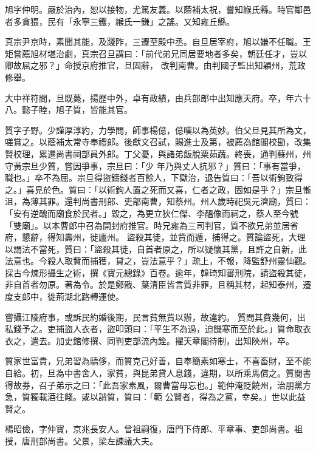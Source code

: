 \begin{pinyinscope}
 旭字仲明。嚴於治內，恕以接物，尤篤友義。以蔭補太祝，嘗知緱氏縣。時官鄰邑者多貪猥，民有「永寧三钁，緱氏一鎌」之謠。又知雍丘縣。



 真宗尹京時，素聞其能，及踐阼，三遷至殿中丞。自旦居宰府，旭以嫌不任職。王矩嘗薦旭材堪治劇，真宗召旦謂曰：「前代弟兄同居要地者多矣，朝廷任才，豈以卿故屈之邪？」命授京府推官，旦固辭，
 改判南曹。由判國子監出知穎州，荒政修舉。



 大中祥符間，旦既薨，揚歷中外，卓有政績，由兵部郎中出知應天府。卒，年六十八。懿子睦，旭子質，皆能其官。



 質字子野。少謹厚淳約，力學問，師事楊億，億嘆以為英妙。伯父旦見其所為文，嗟賞之。以蔭補太常寺奉禮郎。後獻文召試，賜進士及第，被薦為館閣校勘，改集賢校理，累遷尚書祠部員外郎。丁父憂，與諸弟飯脫粟茹蔬。終喪，通判蘇州，州守黃宗旦少質，嘗因爭事，宗旦曰：「少
 年乃與丈人抗邪？」質曰：「事有當爭，職也。」卒不為屈。宗旦得盜鑄錢者百餘人，下獄治，退告質曰：「吾以術鉤致得之。」喜見於色。質曰：「以術鉤人置之死而又喜，仁者之政，固如是乎？」宗旦慚沮，為薄其罪。還判尚書刑部、吏部南曹，知蔡州。州人歲時祀吳元濟廟，質曰：「安有逆醜而廟食於民者。」毀之，為更立狄仁傑、李醞像而祠之，蔡人至今號「雙廟」。以本曹郎中召為開封府推官。時兄雍為三司判官，質不欲兄弟並居省府，懇辭，得知壽州，徙廬州。
 盜殺其徒，並貲而遁，捕得之。質論盜死，大理以謂法不當死，質曰：「盜殺其徒，自首者原之，所以疑懷其黨，且許之自新，此法意也。今殺人取貲而捕獲，貸之，豈法意乎？」疏上，不報，降監舒州靈仙觀。採古今煉形攝生之術，撰《寶元總錄》百卷。逾年，韓琦知審刑院，請盜殺其徒，非自首者勿原。著為令。於是鄭戩、葉清臣皆言質非罪，且稱其材，起知泰州，遷度支郎中，徙荊湖北路轉運使。



 嘗攝江陵府事，或訴民約婚後期，民言貧無貲以辦，故違約。
 質問其費幾何，出私錢予之。吏捕盜人衣者，盜叩頭曰：「平生不為過，迫饑寒而至於此。」質命取衣衣之，遣去。加史館修撰、同判吏部流內銓。擢天章閣待制，出知陜州，卒。



 質家世富貴，兄弟習為驕侈，而質克己好善，自奉簡素如寒士，不喜畜財，至不能自給。初，旦為中書舍人，家貧，與昆弟貸人息錢，違期，以所乘馬償之。質閱書得故券，召子弟示之曰：「此吾家素風，爾曹當毋忘也。」範仲淹貶饒州，治朋黨方急，質獨載酒往餞。或以誚質，質曰：「範
 公賢者，得為之黨，幸矣。」世以此益賢之。



 楊昭儉，字仲寶，京兆長安人。曾祖嗣復，唐門下侍郎、平章事、吏部尚書。祖授，唐刑部尚書。父景，梁左諫議大夫。




\end{pinyinscope}
